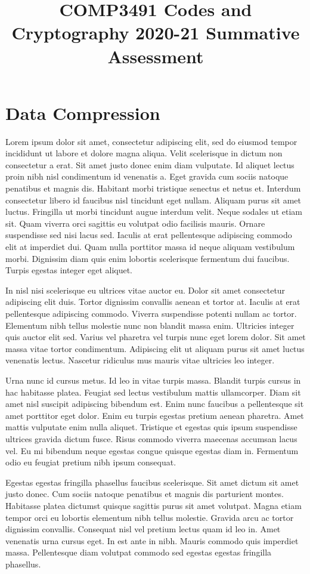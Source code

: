 \documentclass[11pt,a4paper]{article}
\title{COMP3491 Codes and Cryptography 2020-21 Summative Assessment}
\date{\vspace{-5ex}}
\begin{document}
\flushbottom
\maketitle
\section{Data Compression}
Lorem ipsum dolor sit amet, consectetur adipiscing elit, sed do eiusmod tempor incididunt ut labore et dolore magna aliqua. Velit scelerisque in dictum non consectetur a erat. Sit amet justo donec enim diam vulputate. Id aliquet lectus proin nibh nisl condimentum id venenatis a. Eget gravida cum sociis natoque penatibus et magnis dis. Habitant morbi tristique senectus et netus et. Interdum consectetur libero id faucibus nisl tincidunt eget nullam. Aliquam purus sit amet luctus. Fringilla ut morbi tincidunt augue interdum velit. Neque sodales ut etiam sit. Quam viverra orci sagittis eu volutpat odio facilisis mauris. Ornare suspendisse sed nisi lacus sed. Iaculis at erat pellentesque adipiscing commodo elit at imperdiet dui. Quam nulla porttitor massa id neque aliquam vestibulum morbi. Dignissim diam quis enim lobortis scelerisque fermentum dui faucibus. Turpis egestas integer eget aliquet.

In nisl nisi scelerisque eu ultrices vitae auctor eu. Dolor sit amet consectetur adipiscing elit duis. Tortor dignissim convallis aenean et tortor at. Iaculis at erat pellentesque adipiscing commodo. Viverra suspendisse potenti nullam ac tortor. Elementum nibh tellus molestie nunc non blandit massa enim. Ultricies integer quis auctor elit sed. Varius vel pharetra vel turpis nunc eget lorem dolor. Sit amet massa vitae tortor condimentum. Adipiscing elit ut aliquam purus sit amet luctus venenatis lectus. Nascetur ridiculus mus mauris vitae ultricies leo integer.

Urna nunc id cursus metus. Id leo in vitae turpis massa. Blandit turpis cursus in hac habitasse platea. Feugiat sed lectus vestibulum mattis ullamcorper. Diam sit amet nisl suscipit adipiscing bibendum est. Enim nunc faucibus a pellentesque sit amet porttitor eget dolor. Enim eu turpis egestas pretium aenean pharetra. Amet mattis vulputate enim nulla aliquet. Tristique et egestas quis ipsum suspendisse ultrices gravida dictum fusce. Risus commodo viverra maecenas accumsan lacus vel. Eu mi bibendum neque egestas congue quisque egestas diam in. Fermentum odio eu feugiat pretium nibh ipsum consequat.

Egestas egestas fringilla phasellus faucibus scelerisque. Sit amet dictum sit amet justo donec. Cum sociis natoque penatibus et magnis dis parturient montes. Habitasse platea dictumst quisque sagittis purus sit amet volutpat. Magna etiam tempor orci eu lobortis elementum nibh tellus molestie. Gravida arcu ac tortor dignissim convallis. Consequat nisl vel pretium lectus quam id leo in. Amet venenatis urna cursus eget. In est ante in nibh. Mauris commodo quis imperdiet massa. Pellentesque diam volutpat commodo sed egestas egestas fringilla phasellus.
\end{document}
